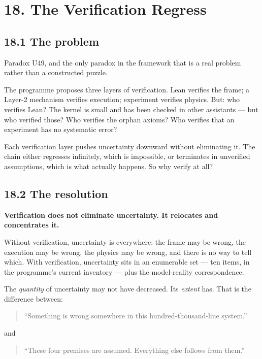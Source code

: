\documentclass[
  11pt]{report}
\begin{document}
\hypertarget{the-verification-regress}{%
\chapter{18. The Verification Regress}\label{the-verification-regress}}

\hypertarget{the-problem-1}{%
\section{18.1 The problem}\label{the-problem-1}}

Paradox U49, and the only paradox in the framework that is a real
problem rather than a constructed puzzle.

The programme proposes three layers of verification. Lean verifies the
frame; a Layer-2 mechanism verifies execution; experiment verifies
physics. But: who verifies Lean? The kernel is small and has been
checked in other assistants --- but who verified those? Who verifies the
orphan axioms? Who verifies that an experiment has no systematic error?

Each verification layer pushes uncertainty downward without eliminating
it. The chain either regresses infinitely, which is impossible, or
terminates in unverified assumptions, which is what actually happens. So
why verify at all?

\hypertarget{the-resolution}{%
\section{18.2 The resolution}\label{the-resolution}}

\textbf{Verification does not eliminate uncertainty. It relocates and
concentrates it.}

Without verification, uncertainty is everywhere: the frame may be wrong,
the execution may be wrong, the physics may be wrong, and there is no
way to tell which. With verification, uncertainty sits in an enumerable
set --- ten items, in the programme's current inventory --- plus the
model-reality correspondence.

The \emph{quantity} of uncertainty may not have decreased. Its
\emph{extent} has. That is the difference between:

\begin{quote}
``Something is wrong somewhere in this hundred-thousand-line system.''
\end{quote}

and

\begin{quote}
``These four premises are assumed. Everything else follows from them.''
\end{quote}
\end{document}
